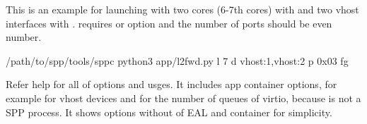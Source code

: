\documentclass[a4paper,11pt,openany,oneside,english]{sphinxmanual}
\begin{document}
This is an example for launching with two cores (6-7th cores) with
 and two vhost interfaces with .
 requires  or  option and the number of
ports should be even number.

\begin{sphinxVerbatim}[commandchars=\\\{\},formatcom=\footnotesize]
  /path/to/spp/tools/sppc
 python3 app/l2fwd.py \PYGZhy{}l \PYGZhy{}7 \PYGZhy{}d vhost:1,vhost:2 \PYGZhy{}p 0x03 \PYGZhy{}fg
\end{sphinxVerbatim}

Refer help for all of options and usges.
It includes app container options, for example  for vhost devices
and  for the number of queues of virtio, because  is not
a SPP process.
It shows options without of EAL and container for simplicity.
\end{document}
